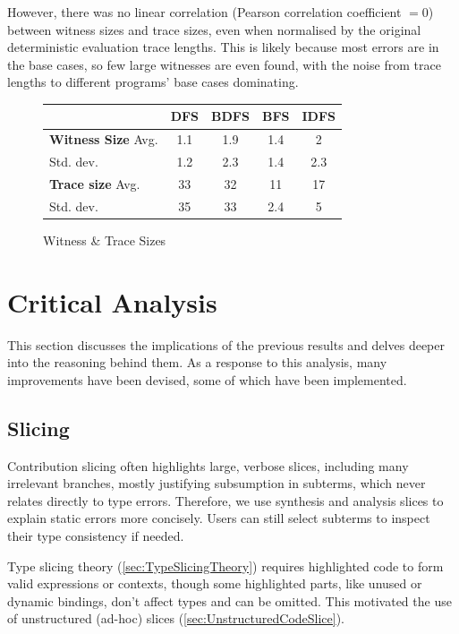 However, there was no linear correlation (Pearson correlation coefficient $= 0$) between witness sizes and trace sizes, even when normalised by the original deterministic evaluation trace lengths. This is likely because most errors are in the base cases, so few large witnesses are even found, with the noise from trace lengths to different programs' base cases dominating. 

\begin{figure}[h]\centering
\begin{tabular}{l|cccc}
& DFS & BDFS & BFS & IDFS\\
\hline
\textbf{Witness Size} Avg. & 1.1& 1.9&1.4&  2\\
Std. dev. & 1.2& 2.3&1.4&  2.3\\
\textbf{Trace size} Avg. & 33& 32& 11& 17\\
Std. dev. & 35& 33&2.4& 5
\end{tabular}
\caption{Witness \& Trace Sizes}
\label{fig:WitnessSize}
\end{figure}


\section{Critical Analysis}\label{sec:CriticalAnalysis}
This section discusses the implications of the previous results and delves deeper into the reasoning behind them. As a response to this analysis, many improvements have been devised, some of which have been implemented.
\subsection{Slicing}\label{sec:SlicingAnalysis}
Contribution slicing often highlights large, verbose slices, including many irrelevant branches, mostly justifying subsumption in subterms, which never relates directly to type errors. Therefore, we use synthesis and analysis slices to explain static errors more concisely. Users can still select subterms to inspect their type consistency if needed.

Type slicing theory (\cref{sec:TypeSlicingTheory}) requires highlighted code to form valid expressions or contexts, though some highlighted parts, like unused or dynamic bindings, don't affect types and can be omitted. This motivated the use of unstructured (ad-hoc) slices (\cref{sec:UnstructuredCodeSlice}).

